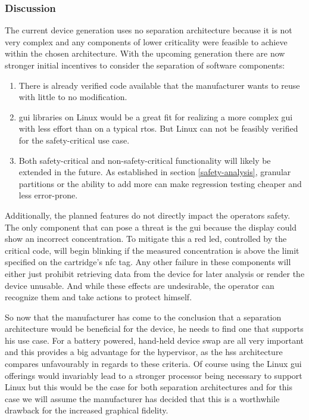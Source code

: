 \subsubsection{Discussion}
The current device generation uses no separation architecture because it is not very complex and any components of lower criticality were feasible to achieve within the chosen architecture. With the upcoming generation there are now stronger initial incentives to consider the separation of software components:
\begin{enumerate}
\item There is already verified code available that the manufacturer wants to reuse with little to no modification.
\item \acrshort{gui} libraries on Linux would be a great fit for realizing a more complex \acrshort{gui} with less effort than on a typical \acrshort{rtos}. But Linux can not be feasibly verified for the safety-critical use case.
\item Both safety-critical and non-safety-critical functionality will likely be extended in the future. As established in section  \ref{safety-analysis}, granular partitions or the ability to add more can make regression testing cheaper and less error-prone.
\end{enumerate}
Additionally, the planned features do not directly impact the operators safety. The only component that can pose a threat is the \acrshort{gui} because the display could show an incorrect concentration. To mitigate this a red \acrshort{led}, controlled by the critical code, will begin blinking if the measured concentration is above the limit specified on the cartridge's \acrshort{nfc} tag. Any other failure in these components will either just prohibit retrieving data from the device for later analysis or render the device unusable. And while these effects are undesirable, the operator can recognize them and take actions to protect himself.

So now that the manufacturer has come to the conclusion that a separation architecture would be beneficial for the device, he needs to find one that supports his use case. For a battery powered, hand-held device \acrshort{swap} are all very important and this provides a big advantage for the hypervisor, as the \acrshort{hss} architecture compares unfavourably in regards to these criteria. Of course using the Linux \acrshort{gui} offerings would invariably lead to a stronger processor being necessary to support Linux but this would be the case for both separation architectures and for this case we will assume the manufacturer has decided that this is a worthwhile drawback for the increased graphical fidelity. 

